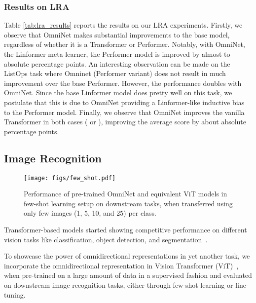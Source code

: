 \documentclass{article}
\begin{document}
\subsubsection{Results on LRA}
Table \ref{tab:lra_results} reports the results on our LRA experiments. Firstly, we observe that OmniNet makes substantial improvements to the base model, regardless of whether it is a Transformer or Performer. Notably, with OmniNet, the Linformer meta-learner, the Performer model is improved by almost  to  absolute percentage points. An interesting observation can be made on the ListOps task where Omninet (Performer variant) does not result in much improvement over the base Performer. However, the performance doubles with OmniNet. Since the base Linformer model does pretty well on this task, we postulate that this is due to OmniNet providing a Linformer-like inductive bias to the Performer model. Finally, we observe that OmniNet improves the vanilla Transformer in both cases ( or ),  improving the average score by about  absolute percentage points.
\nocite{langley00}

\subsection{Image Recognition}

\begin{figure*}[t!]
\vspace{-10pt}
\begin{center}
\texttt{[image: figs/few\_shot.pdf]}
\end{center}
\vspace{-15pt}
\caption{Performance of pre-trained OmniNet and equivalent ViT models in few-shot learning setup on downstream tasks, when transferred using only few images (1, 5, 10, and  25) per class.}
\label{fig:OmniNet-ViT-few_shot}
\vspace{-15pt}
\end{figure*}

Transformer-based models started showing competitive performance on different vision tasks like classification, object detection, and segmentation~\citep{chen2020generative, dosovitskiy2020image, carion2020end, kumar2021colorization}.

To showcase the power of omnidirectional representations in yet another task, we incorporate the omnidirectional representation in Vision Transformer (ViT)~\citep{dosovitskiy2020image}, when pre-trained on a large amount of data in a supervised fashion and evaluated on downstream image recognition tasks, either through few-shot learning or fine-tuning. 
\end{document}

